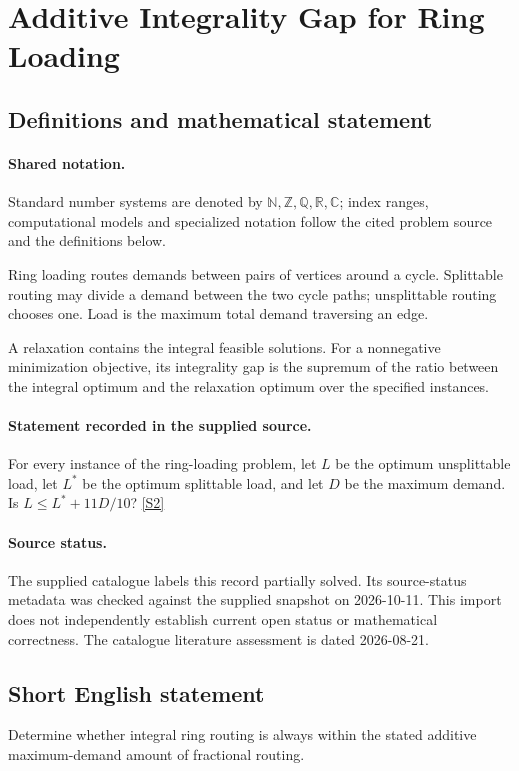 \documentclass[11pt]{article}
\newcommand{\sref}[2]{\hyperlink{source:#1:#2}{[S#2]}}
\begin{document}
\section{Additive Integrality Gap for Ring Loading}\label{statement}

\subsection{Definitions and mathematical statement}

\paragraph{Shared notation.}Standard number systems are denoted by $\mathbb N,\mathbb Z,\mathbb Q,\mathbb R,\mathbb C$; index ranges, computational models and specialized notation follow the cited problem source and the definitions below.


Ring loading routes demands between pairs of vertices around a cycle. Splittable routing may divide a demand between the two cycle paths; unsplittable routing chooses one. Load is the maximum total demand traversing an edge.

A relaxation contains the integral feasible solutions. For a nonnegative minimization objective, its integrality gap is the supremum of the ratio between the integral optimum and the relaxation optimum over the specified instances.
\paragraph{Statement recorded in the supplied source.}
For every instance of the ring-loading problem, let $L$ be the optimum unsplittable load, let $L^*$ be the optimum splittable load, and let $D$ be the maximum demand. Is $L\leq L^*+11D/10$? \sref{statement}{2}
\paragraph{Source status.}
The supplied catalogue labels this record partially solved. Its source-status metadata was checked against the supplied snapshot on 2026-10-11. This import does not independently establish current open status or mathematical correctness. The catalogue literature assessment is dated 2026-08-21.
\subsection{Short English statement}
Determine whether integral ring routing is always within the stated additive maximum-demand amount of fractional routing.
\end{document}
